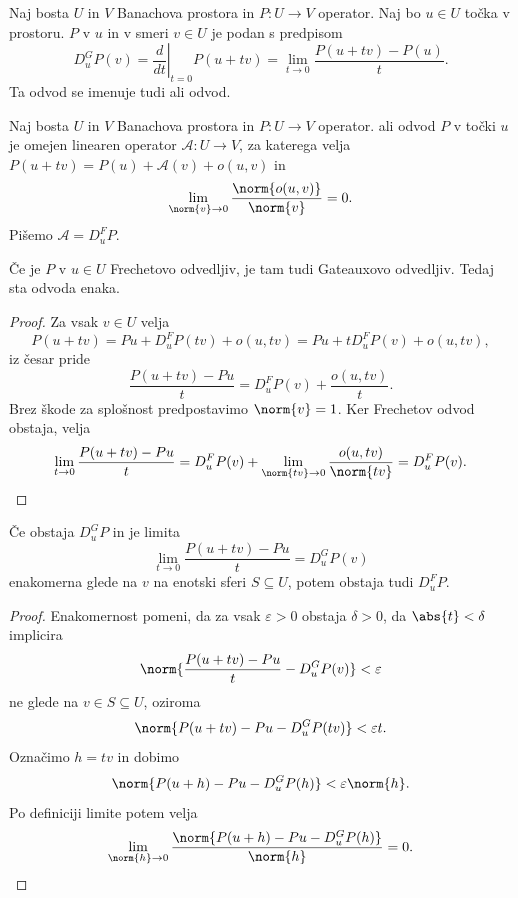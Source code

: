
\begin{definicija}
  Naj bosta $U$ in $V$ Banachova prostora in $P: U \to V$ operator.
  Naj bo $u \in U$ točka v prostoru.
   $P$ v $u$ in v smeri $v \in U$ je podan s predpisom
  \[
	D_u^G P (v) = \left. \frac{d}{dt} \right|_{t=0} P(u + tv)
	= \lim_{t \to 0} \frac{P(u + tv) - P(u)}{t}.
  \]
  Ta odvod se imenuje tudi  ali  odvod.
\end{definicija}

\begin{definicija}
  Naj bosta $U$ in $V$ Banachova prostora in $P: U \to V$ operator.
   ali  odvod $P$ v točki $u$ je omejen linearen
  operator $\mathcal{A} : U \to V$, za katerega velja $P(u + tv) = P(u) +
  \mathcal{A}(v) + o(u, v)$ in
  \[
	\lim_{\norm{v} \to 0} \frac{\norm{o(u, v)}}{\norm{v}} = 0.
  \]
  Pišemo $\mathcal{A} = D_u^F P$.
\end{definicija}


\begin{trditev}
  Če je $P$ v $u \in U$ Frechetovo odvedljiv, je tam tudi Gateauxovo odvedljiv.
  Tedaj sta odvoda enaka.
\end{trditev}

\begin{proof}
  Za vsak $v \in U$ velja
  \[
	P(u + tv) = Pu + D_u^F P(tv) + o(u, tv)
	= Pu + t D_u^F P(v) + o(u, tv),
  \]
  iz česar pride
  \[
	\frac{P(u+tv)-Pu}{t} = D_u^F P(v) + \frac{o(u, tv)}{t}.
  \]
  Brez škode za splošnost predpostavimo $\norm{v} = 1$.
  Ker Frechetov odvod obstaja, velja
  \[
	\lim_{t \to 0} \frac{P(u+tv) - Pu}{t}
	= D_u^F P(v) + \lim_{\norm{tv} \to 0} \frac{o(u,tv)}{\norm{tv}}
	= D_u^F P(v).
  \]
\end{proof}

\begin{trditev}
  Če obstaja $D_u^G P$ in je limita
  \[
	\lim_{t \to 0} \frac{P(u+tv)-Pu}{t} = D_u^G P(v)
  \]
  enakomerna glede na $v$ na enotski sferi $S \subseteq U$, potem obstaja tudi
  $D_u^F P$.
\end{trditev}

\begin{proof}
  Enakomernost pomeni, da za vsak $\varepsilon > 0$ obstaja $\delta > 0$, da
  $\abs{t} < \delta$ implicira
  \[
	\norm{\frac{P(u+tv) - Pu}{t} - D_u^G P(v)} < \varepsilon
  \]
  ne glede na $v \in S \subseteq U$, oziroma
  \[
	\norm{P(u+tv) - Pu - D_u^G P(tv)} < \varepsilon t.
  \]
  Označimo $h = tv$ in dobimo
  \[
	\norm{P(u+h) - Pu - D_u^GP(h)} < \varepsilon \norm{h}.
  \]
  Po definiciji limite potem velja
  \[
	\lim_{\norm{h} \to 0} \frac{\norm{P(u+h) - Pu - D_u^G P(h)}}{\norm{h}} = 0.
  \]
\end{proof}

